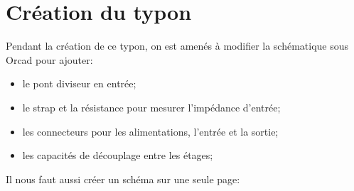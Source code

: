 \chapter{Création du typon}
Pendant la création de ce typon, on est amenés à modifier la schématique sous Orcad pour ajouter:
\begin{itemize}
    \item le pont diviseur en entrée;
    \item le strap et la résistance pour mesurer l’impédance d’entrée;
    \item les connecteurs pour les alimentations, l’entrée et la sortie;
    \item les capacités de découplage entre les étages;
\end{itemize}

Il nous faut aussi créer un schéma sur une seule page:

